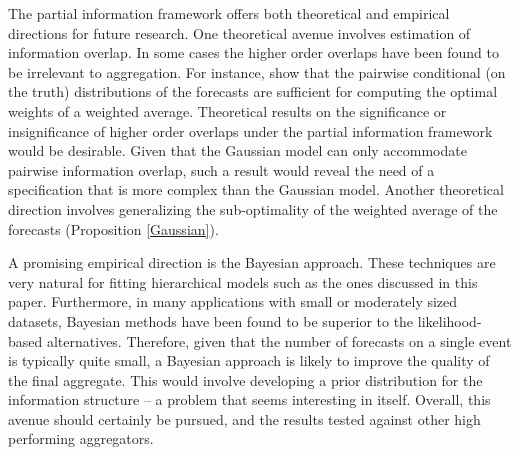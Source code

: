 \documentclass[11pt]{article}
\theoremstyle{definition}
\theoremstyle{definition}
\begin{document}
      
      The partial information framework offers both theoretical and empirical directions for future research. One theoretical avenue involves estimation of information overlap. In some cases the higher order overlaps have been found to be irrelevant to aggregation. For instance, \cite{degroot1991optimal} show that the pairwise conditional (on the truth) distributions of the forecasts are sufficient for computing the optimal weights of a weighted average. Theoretical results on the significance or insignificance of higher order overlaps under the partial information framework would be desirable. Given that the Gaussian model can only accommodate pairwise information overlap, such a result would reveal the need of a specification that is more complex than the Gaussian model. Another theoretical direction involves generalizing the sub-optimality of the weighted average of the forecasts  (Proposition \ref{Gaussian}).
      
      
A promising empirical direction is the Bayesian approach.  These techniques are very natural for fitting hierarchical models such as the ones discussed in this paper.  Furthermore, in many applications with small or moderately sized datasets, Bayesian methods have been found to be superior to the likelihood-based alternatives. Therefore, given that the number of forecasts on a single event is typically quite small, a Bayesian approach is likely to improve the quality of the final aggregate. This would involve  developing a prior distribution for the information structure -- a problem that seems interesting in itself. 
%      
Overall, this avenue should certainly be pursued, and the results tested against other high performing aggregators.
      
        
\end{document}
